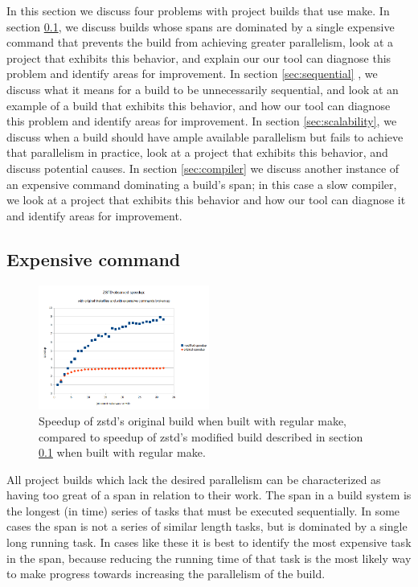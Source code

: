 \documentclass[sigconf,10pt,review,authorversion]{acmart}\settopmatter{printfolios=true,printccs=false,printacmref=false}
\begin{document}
In this section we discuss four problems with project builds that use make.  In section \ref{sec:expensive},
we discuss
builds whose spans are dominated by a single expensive command that prevents the build from
achieving greater parallelism, look at a project that exhibits this behavior, and explain our
our tool can diagnose this problem and identify areas for improvement.  In section \ref{sec:sequential}
, we discuss what
it means for a build to be unnecessarily sequential, and look at an example of a build that
exhibits this behavior, and how our tool can diagnose this problem and identify areas for improvement.
In section \ref{sec:scalability}, we discuss when a build should have ample available parallelism
but fails to achieve that
parallelism in practice, look at a project that exhibits this behavior, and discuss potential causes.
In section \ref{sec:compiler} we discuss another instance of an expensive command dominating a
build's span; in this case a
slow compiler, we look at a project that exhibits this behavior and how our tool can diagnose it
and identify areas for improvement.

\subsection{Expensive command}
\label{sec:expensive}

\begin{figure}[t]
  \includegraphics[width=0.5\textwidth]{zstd-speedup}
  \caption{Speedup of zstd's original build when built with regular make,
    compared to speedup of zstd's modified build described in section \ref{sec:expensive}
  when built with regular make.}
  \label{fig:zstd}
\end{figure}

All project builds which lack the desired parallelism can be characterized as having too great of
a span in relation to their work.  The span in a build system is the longest (in time) series of
tasks that must be executed sequentially.  In some cases the span is not a series of similar length
tasks, but is dominated by a single long running task.  In cases like these it is best to identify
the most expensive task in the span, because reducing the running time of that task is the
most likely way to make progress towards increasing the parallelism of the build.
\end{document}
